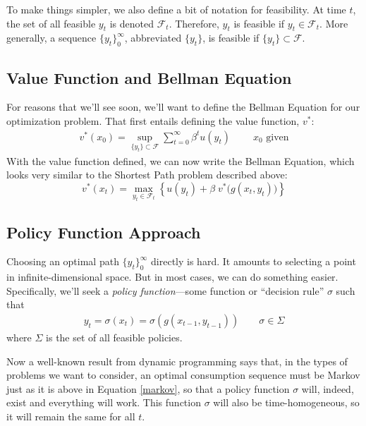 \documentclass[a4paper,12pt]{scrartcl}
\begin{document}
To make things simpler, we also define a bit of notation for feasibility. At time $t$, the set of all feasible $y_t$ is denoted $\mathcal{F}_t$. Therefore, $y_t$ is feasible if $y_t\in \mathcal{F}_t$. More generally, a sequence $\{y_t\}^\infty_0$, abbreviated $\{y_t\}$, is feasible if $\{y_t\} \subset \mathcal{F}$.

\subsection{Value Function and Bellman Equation}

For reasons that we'll see soon, we'll want to define the Bellman
Equation for our optimization problem. That first entails
defining the value function, $v^*$: 
\begin{align*}
  v^*(x_0) = \sup_{ \{y_t\} \subset \mathcal{F}}
  \sum^\infty_{t=0} \beta^t u(y_t)\; 
  \qquad
  \text{$x_0$ given}
\end{align*}
With the value function defined, we can now write the Bellman Equation, which looks very similar to the Shortest Path problem described above:
\begin{equation}
  v^*(x_t) = \max_{y_t \in \mathcal{F}_t} 
  \left\{ u(y_t) + \beta \; v^*\big(g(x_t, y_t)\big) \right\}
\end{equation}



\subsection{Policy Function Approach}

Choosing an optimal path $\{y_t\}_0^\infty$ directly is hard. It
amounts to selecting a point in infinite-dimensional space.
But in most cases, we can do something easier. Specifically,
we'll seek a \emph{policy function}---some function or
``decision rule'' $\sigma$ such that 
\begin{align}
  \label{markov}
  y_t = \sigma(x_t) = \sigma(g(x_{t-1}, y_{t-1}))
  \qquad \sigma \in \Sigma
\end{align}
where $\Sigma$ is the set of all feasible policies. 

Now a well-known result from dynamic programming says that, in
the types of problems we want to consider, an optimal
consumption sequence must be Markov just as it is above in
Equation \ref{markov}, so that a policy function $\sigma$ will,
indeed, exist and everything will work. This function $\sigma$
will also be time-homogeneous, so it will remain the same for
all $t$.
\end{document}
